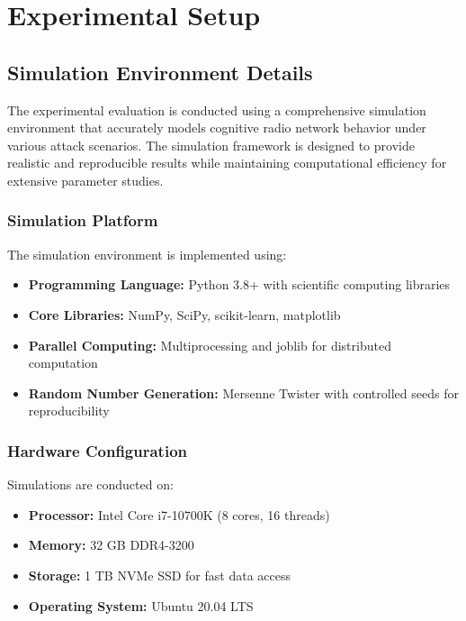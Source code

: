 
\chapter{Experimental Setup}

\section{Simulation Environment Details}
The experimental evaluation is conducted using a comprehensive simulation environment that accurately models cognitive radio network behavior under various attack scenarios. The simulation framework is designed to provide realistic and reproducible results while maintaining computational efficiency for extensive parameter studies.

\subsection{Simulation Platform}
The simulation environment is implemented using:
\begin{itemize}
\item \textbf{Programming Language:} Python 3.8+ with scientific computing libraries
\item \textbf{Core Libraries:} NumPy, SciPy, scikit-learn, matplotlib
\item \textbf{Parallel Computing:} Multiprocessing and joblib for distributed computation
\item \textbf{Random Number Generation:} Mersenne Twister with controlled seeds for reproducibility
\end{itemize}

\subsection{Hardware Configuration}
Simulations are conducted on:
\begin{itemize}
\item \textbf{Processor:} Intel Core i7-10700K (8 cores, 16 threads)
\item \textbf{Memory:} 32 GB DDR4-3200
\item \textbf{Storage:} 1 TB NVMe SSD for fast data access
\item \textbf{Operating System:} Ubuntu 20.04 LTS
\end{itemize}

